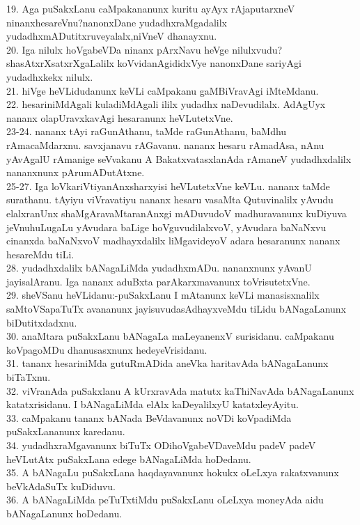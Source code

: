 \documentclass{article}
\begin{document}
19. Aga puSakxLanu caMpakananunx kuritu ayAyx rAjaputarxneV ninanxhesareVnu?nanonxDane yudadhxraMgadalilx yudadhxmADutitxruveyalalx,niVneV dhanayxnu.\\
20. Iga nilulx hoVgabeVDa ninanx pArxNavu heVge nilulxvudu? shasAtxrXsatxrXgaLalilx koVvidanAgididxVye nanonxDane sariyAgi yudadhxkekx nilulx.\\
21. hiVge heVLidudanunx keVLi caMpakanu gaMBiVravAgi iMteMdanu.\\
22. hesariniMdAgali kuladiMdAgali ililx yudadhx naDevudilalx. AdAgUyx nananx olapUravxkavAgi hesaranunx heVLutetxVne.\\
23-24. nananx tAyi raGunAthanu, taMde raGunAthanu, baMdhu rAmacaMdarxnu. savxjanavu rAGavanu. nananx hesaru rAmadAsa, nAnu yAvAgalU rAmanige seVvakanu A BakatxvatasxlanAda rAmaneV yudadhxdalilx nananxnunx pArumADutAtxne.\\
25-27. Iga loVkariVtiyanAnxsharxyisi heVLutetxVne keVLu. nananx taMde surathanu. tAyiyu viVravatiyu nananx hesaru vasaMta Qutuvinalilx yAvudu elalxranUnx shaMgAravaMtaranAnxgi mADuvudoV madhuravanunx kuDiyuva jeVnuhuLugaLu yAvudara baLige hoVguvudilalxvoV, yAvudara baNaNxvu cinanxda baNaNxvoV madhayxdalilx liMgavideyoV adara hesaranunx nananx hesareMdu tiLi.\\
28. yudadhxdalilx bANagaLiMda yudadhxmADu. nananxnunx yAvanU jayisalAranu. Iga nananx aduBxta parAkarxmavanunx toVrisutetxVne.\\
29. sheVSanu heVLidanu:-puSakxLanu I mAtanunx keVLi manasisxnalilx saMtoVSapaTuTx avananunx jayisuvudasAdhayxveMdu tiLidu bANagaLanunx biDutitxdadxnu.\\
30. anaMtara puSakxLanu bANagaLa maLeyanenxV surisidanu. caMpakanu koVpagoMDu dhanusasxnunx hedeyeVrisidanu.\\
31. tananx hesariniMda gutuRmADida aneVka haritavAda bANagaLanunx biTaTxnu.\\
32. viVranAda puSakxlanu A kUrxravAda matutx kaThiNavAda bANagaLanunx katatxrisidanu. I bANagaLiMda elAlx kaDeyalilxyU katatxleyAyitu.\\
33. caMpakanu tananx bANada BeVdavanunx noVDi koVpadiMda puSakxLananunx karedanu.\\
34. yudadhxraMgavanunx biTuTx ODihoVgabeVDaveMdu padeV padeV heVLutAtx puSakxLana edege bANagaLiMda hoDedanu.\\
35. A bANagaLu puSakxLana haqdayavanunx hokukx oLeLxya rakatxvanunx beVkAdaSuTx kuDiduvu.\\
36. A bANagaLiMda peTuTxtiMdu puSakxLanu oLeLxya moneyAda aidu bANagaLanunx hoDedanu.\\
\end{document}
